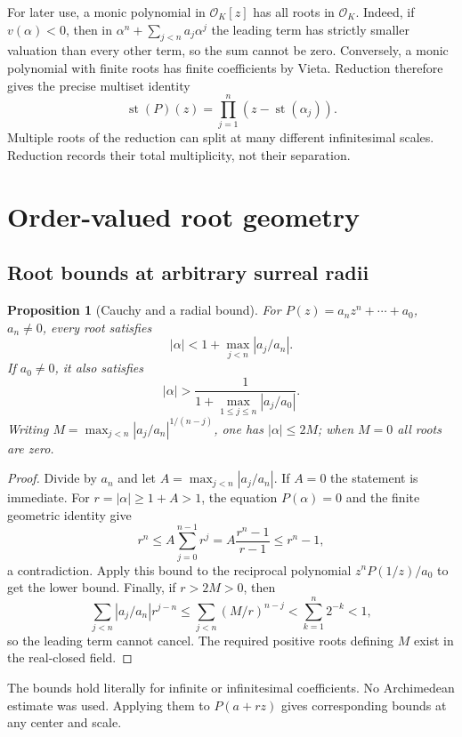 \documentclass[11pt,letterpaper]{article}
\numberwithin{equation}{section}
\newtheorem{proposition}[theorem]{Proposition}
\theoremstyle{definition}
\theoremstyle{remark}\newtheorem{remark}[theorem]{Remark}
\newcommand{\OO}{\mathcal O}
\newcommand{\st}{\operatorname{st}}
\begin{document}
For later use, a monic polynomial in $\OO_K[z]$ has all roots in
$\OO_K$. Indeed, if $v(\alpha)<0$, then in
$\alpha^n+\sum_{j<n}a_j\alpha^j$ the leading term has strictly smaller
valuation than every other term, so the sum cannot be zero. Conversely,
a monic polynomial with finite roots has finite coefficients by Vieta.
Reduction therefore gives the precise multiset identity
\begin{equation}\label{eq:reductionfactor}
 \st(P)(z)=\prod_{j=1}^n(z-\st(\alpha_j)).
\end{equation}
Multiple roots of the reduction can split at many different infinitesimal
scales. Reduction records their total multiplicity, not their separation.

\section{Order-valued root geometry}\label{sec:geometry}

\subsection{Root bounds at arbitrary surreal radii}
\begin{proposition}[Cauchy and a radial bound]\label{prop:rootbounds}
For $P(z)=a_nz^n+\cdots+a_0$, $a_n\ne0$, every root satisfies
\begin{equation}\label{eq:cauchybound}
 |\alpha|<1+\max_{j<n}|a_j/a_n|.
\end{equation}
If $a_0\ne0$, it also satisfies
\[
 |\alpha|>\frac{1}{1+\max_{1\le j\le n}|a_j/a_0|}.
\]
Writing $M=\max_{j<n}|a_j/a_n|^{1/(n-j)}$, one has $|\alpha|\le2M$;
when $M=0$ all roots are zero.
\end{proposition}
\begin{proof}
Divide by $a_n$ and let $A=\max_{j<n}|a_j/a_n|$. If $A=0$ the statement
is immediate. For $r=|\alpha|\ge1+A>1$, the equation $P(\alpha)=0$
and the finite geometric identity give
\[
 r^n\le A\sum_{j=0}^{n-1}r^j
   =A\frac{r^n-1}{r-1}\le r^n-1,
\]
a contradiction. Apply this bound to the reciprocal polynomial
$z^nP(1/z)/a_0$ to get the lower bound. Finally, if $r>2M>0$, then
\[
 \sum_{j<n}|a_j/a_n|r^{j-n}
 \le\sum_{j<n}(M/r)^{n-j}<\sum_{k=1}^n2^{-k}<1,
\]
so the leading term cannot cancel. The required positive roots defining
$M$ exist in the real-closed field.
\end{proof}
The bounds hold literally for infinite or infinitesimal coefficients.
No Archimedean estimate was used. Applying them to $P(a+rz)$ gives
corresponding bounds at any center and scale.
\end{document}
